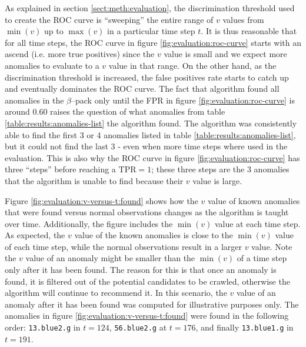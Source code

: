 As explained in section \ref{sect:meth:evaluation}, the discrimination threshold used to create the ROC curve is ``sweeping'' the entire range of $v$ values from $\min(v)$ up to $\max(v)$ in a particular time step $t$. It is thus reasonable that for all time steps, the ROC curve in figure \ref{fig:evaluation:roc-curve} starts with an ascend (i.e. more true positives) since the $v$ value is small and we expect more anomalies to evaluate to a $v$ value in that range. On the other hand, as the discrimination threshold is increased, the false positives rate starts to catch up and eventually dominates the ROC curve. The fact that \mlblink algorithm found all anomalies in the $\beta$--pack only until the FPR in figure \ref{fig:evaluation:roc-curve} is around $0.60$ raises the question of what anomalies from table \ref{table:results:anomalies-list} the algorithm found. The \mlblink algorithm was consistently able to find the first 3 or 4 anomalies listed in table \ref{table:results:anomalies-list}, but it could not find the last 3 - even when more time steps where used in the evaluation. This is also why the ROC curve in figure \ref{fig:evaluation:roc-curve} has three ``steps'' before reaching a $\text{TPR} = 1$; these three steps are the 3 anomalies that the \mlblink algorithm is unable to find because their $v$ value is large. \newline

Figure \ref{fig:evaluation:v-versus-t:found} shows how the $v$ value of known anomalies that were found versus normal observations changes as the \mlblink algorithm is taught over time. Additionally, the figure includes the $\min(v)$ value at each time step. As expected, the $v$ value of the known anomalies is close to the $\min(v)$ value of each time step, while the normal observations result in a larger $v$ value. Note the $v$ value of an anomaly might be smaller than the $\min(v)$ of a time step only after it has been found. The reason for this is that once an anomaly is found, it is filtered out of the potential candidates to be crawled, otherwise the \mlblink algorithm will continue to recommend it. In this scenario, the $v$ value of an anomaly after it has been found was computed for illustrative purposes only. The anomalies in figure \ref{fig:evaluation:v-versus-t:found} were found in the following order: \texttt{13.blue2.g} in $t = 124$, \texttt{56.blue2.g} at $t = 176$, and finally \texttt{13.blue1.g} in $t = 191$.

